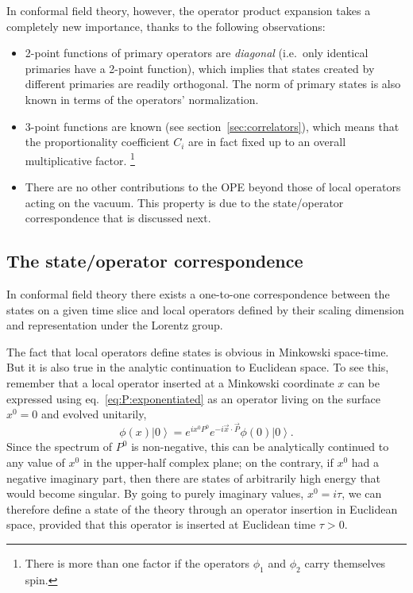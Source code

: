 \documentclass[a4paper,12pt]{article}
\newcommand{\ket}[1]{\left| #1 \right\rangle}
\numberwithin{equation}{section}
\begin{document}
In conformal field theory, however, the operator product expansion takes a completely new importance, thanks to the following observations:
%
\begin{itemize}

\item
2-point functions of primary operators are \emph{diagonal} (i.e.~only identical primaries have a 2-point function), which implies that states created by different primaries are readily orthogonal. The norm of primary states is also known in terms of the operators' normalization. 

\item
3-point functions are known (see section~\ref{sec:correlators}), which means that the proportionality coefficient $C_i$ are in fact fixed up to an overall multiplicative factor.%
%
\footnote{There is more than one factor if the operators $\phi_1$ and $\phi_2$ carry themselves spin.}
%

\item
There are no other contributions to the OPE beyond those of local operators acting on the vacuum. This property is due to the state/operator correspondence that is discussed next.

\end{itemize}
%

\subsection{The state/operator correspondence}

In conformal field theory there exists a one-to-one correspondence between the states on a given time slice and local operators defined by their scaling dimension and representation under the Lorentz group.

The fact that local operators define states is obvious in Minkowski space-time. But it is also true in the analytic continuation to Euclidean space. To see this, remember that a local operator inserted at a Minkowski coordinate $x$ can be expressed using eq.~\eqref{eq:P:exponentiated} as an operator living on the surface $x^0 = 0$ and evolved unitarily,
\begin{equation}
	\phi(x) \ket{0}
	= e^{i x^0 P^0} e^{-i \vec{x} \cdot \vec{P}} \phi(0) \ket{0}.
\end{equation}
Since the spectrum of $P^0$ is non-negative, this can be analytically continued to any value of $x^0$ in the upper-half complex plane; on the contrary, if $x^0$ had a negative imaginary part, then there are states of arbitrarily high energy that would become singular. 
By going to purely imaginary values, $x^0 = i \tau$, we can therefore define a state of the theory through an operator insertion in Euclidean space, provided that this operator is inserted at Euclidean time $\tau > 0$.
\end{document}
